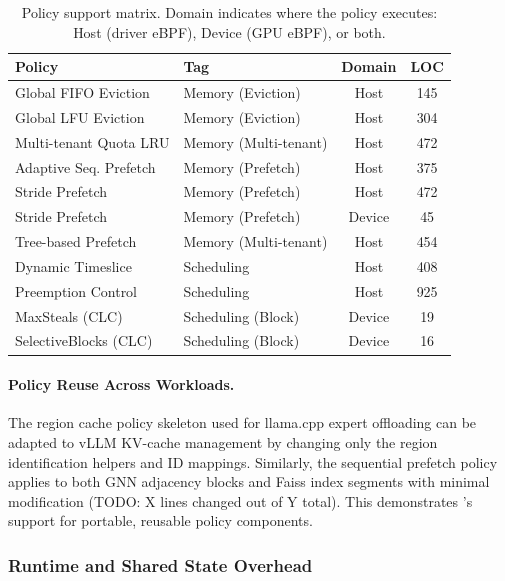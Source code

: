\begin{table}[t]
\centering
\small

\begin{tabularx}{\columnwidth}{@{} X l c c @{}}
\toprule
\textbf{Policy} & \textbf{Tag} & \textbf{Domain} & \textbf{LOC} \\
\midrule
Global FIFO Eviction & Memory (Eviction) & Host & 145 \\
Global LFU Eviction & Memory (Eviction) & Host & 304 \\
Multi-tenant Quota LRU & Memory (Multi-tenant) & Host & 472 \\
Adaptive Seq. Prefetch & Memory (Prefetch) & Host & 375 \\
Stride Prefetch & Memory (Prefetch) & Host & 472 \\
Stride Prefetch & Memory (Prefetch) & Device & 45 \\
Tree-based Prefetch & Memory (Multi-tenant) & Host & 454 \\
Dynamic Timeslice & Scheduling & Host & 408 \\
Preemption Control & Scheduling & Host & 925 \\
MaxSteals (CLC) & Scheduling (Block) & Device & 19 \\
SelectiveBlocks (CLC) & Scheduling (Block) & Device & 16 \\
\bottomrule
\end{tabularx}
\caption{Policy support matrix. Domain indicates where the policy executes: Host (driver eBPF), Device (GPU eBPF), or both.}
\label{tab:support-matrix}
\end{table}


\paragraph{Policy Reuse Across Workloads.}
The region cache policy skeleton used for llama.cpp expert offloading can be adapted to vLLM KV-cache management by changing only the region identification helpers and ID mappings. Similarly, the sequential prefetch policy applies to both GNN adjacency blocks and Faiss index segments with minimal modification (TODO: X lines changed out of Y total). This demonstrates \sys's support for portable, reusable policy components.

\subsubsection{Runtime and Shared State Overhead}

